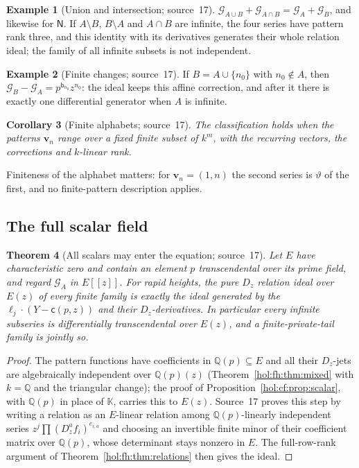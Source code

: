 \documentclass[11pt]{article}
\numberwithin{equation}{section}
\newtheorem{theorem}{Theorem}[section]
\newtheorem{corollary}[theorem]{Corollary}
\theoremstyle{definition}
\newtheorem{example}[theorem]{Example}
\theoremstyle{remark}
\newcommand{\Q}{\mathbb Q}
\newcommand{\KK}{\mathbb K}
\begin{document}
\begin{example}[Union and intersection; source~17]\label{hol:fh:ex:union}
$\mathcal G_{A\cup B}+\mathcal G_{A\cap B}=\mathcal G_A+\mathcal G_B$, and
likewise for $\mathsf N$. If $A\setminus B$, $B\setminus A$ and $A\cap B$ are
infinite, the four series have pattern rank three, and this identity with its
derivatives generates their whole relation ideal; the family of all infinite
subsets is not independent.
\end{example}

\begin{example}[Finite changes; source~17]\label{hol:fh:ex:finite}
If $B=A\cup\{n_0\}$ with $n_0\notin A$, then $\mathcal G_B-\mathcal G_A=
p^{\mathsf b_{n_0}}z^{n_0}$: the ideal keeps this affine correction, and after it
there is exactly one differential generator when $A$ is infinite.
\end{example}

\begin{corollary}[Finite alphabets; source~17]\label{hol:fh:cor:alphabet}
The classification holds when the patterns $\mathbf v_n$ range over a fixed
finite subset of $k^m$, with the recurring vectors, the corrections and
$k$-linear rank.
\end{corollary}

Finiteness of the alphabet matters: for $\mathbf v_n=(1,n)$ the second series
is $\vartheta$ of the first, and no finite-pattern description applies.

\subsection{The full scalar field}\label{hol:fh:sub:scalars}

\begin{theorem}[All scalars may enter the equation; source~17]
\label{hol:fh:thm:allscalars}
Let $E$ have characteristic zero and contain an element $p$ transcendental
over its prime field, and regard $\mathcal G_A$ in $E[[z]]$. For rapid heights,
the pure $D_z$ relation ideal over $E(z)$ of every finite family is exactly the
ideal generated by the $\boldsymbol\ell_j\cdot(Y-\mathsf c(p,z))$ and their
$D_z$-derivatives. In particular every infinite subseries is differentially
transcendental over $E(z)$, and a finite-private-tail family is jointly so.
\end{theorem}

\begin{proof}
The pattern functions have coefficients in $\Q(p)\subseteq E$ and all their
$D_z$-jets are algebraically independent over $\Q(p)(z)$
(Theorem~\ref{hol:fh:thm:mixed} with $k=\Q$ and the triangular change); the
proof of Proposition~\ref{hol:cf:prop:scalar}, with $\Q(p)$ in place of $\KK$,
carries this to $E(z)$. Source~17 proves
this step by writing a relation as an $E$-linear relation among $\Q(p)$-linearly
independent series $z^j\prod(D_z^af_i)^{e_{i,a}}$ and choosing an invertible
finite minor of their coefficient matrix over $\Q(p)$, whose determinant stays
nonzero in $E$. The full-row-rank argument of
Theorem~\ref{hol:fh:thm:relations} then gives the ideal.
\end{proof}
\end{document}
